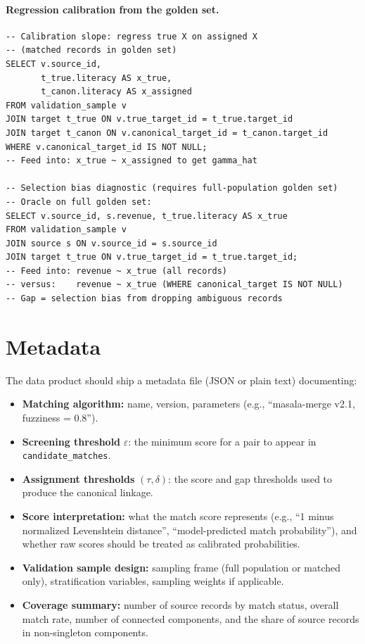 \documentclass[12pt]{article}
\begin{document}
\paragraph{Regression calibration from the golden set.}

\begin{lstlisting}[style=sql]
-- Calibration slope: regress true X on assigned X
-- (matched records in golden set)
SELECT v.source_id,
       t_true.literacy AS x_true,
       t_canon.literacy AS x_assigned
FROM validation_sample v
JOIN target t_true ON v.true_target_id = t_true.target_id
JOIN target t_canon ON v.canonical_target_id = t_canon.target_id
WHERE v.canonical_target_id IS NOT NULL;
-- Feed into: x_true ~ x_assigned to get gamma_hat

-- Selection bias diagnostic (requires full-population golden set)
-- Oracle on full golden set:
SELECT v.source_id, s.revenue, t_true.literacy AS x_true
FROM validation_sample v
JOIN source s ON v.source_id = s.source_id
JOIN target t_true ON v.true_target_id = t_true.target_id;
-- Feed into: revenue ~ x_true (all records)
-- versus:    revenue ~ x_true (WHERE canonical_target IS NOT NULL)
-- Gap = selection bias from dropping ambiguous records
\end{lstlisting}


\section{Metadata}

The data product should ship a metadata file (JSON or plain text) documenting:

\begin{itemize}
    \item \textbf{Matching algorithm:} name, version, parameters (e.g., ``masala-merge v2.1, fuzziness = 0.8'').
    \item \textbf{Screening threshold} $\varepsilon$: the minimum score for a pair to appear in \texttt{candidate\_matches}.
    \item \textbf{Assignment thresholds} $(\tau, \delta)$: the score and gap thresholds used to produce the canonical linkage.
    \item \textbf{Score interpretation:} what the match score represents (e.g., ``1 minus normalized Levenshtein distance'', ``model-predicted match probability''), and whether raw scores should be treated as calibrated probabilities.
    \item \textbf{Validation sample design:} sampling frame (full population or matched only), stratification variables, sampling weights if applicable.
    \item \textbf{Coverage summary:} number of source records by match status, overall match rate, number of connected components, and the share of source records in non-singleton components.
\end{itemize}
\end{document}
